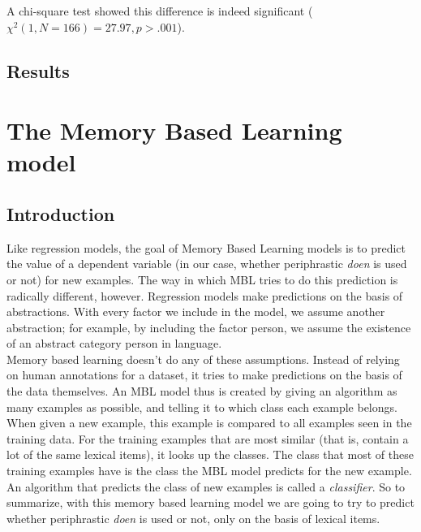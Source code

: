 \documentclass[12pt]{article}
\begin{document}
A chi-square test showed this difference is indeed significant ($\chi^2(1, N=166) = 27.97, p > .001$).


\subsection{Results} \label{regressionresults}








\section{The Memory Based Learning model} \label{mbl}

\subsection{Introduction}

Like regression models, the goal of Memory Based Learning models is to predict the value of a dependent variable (in our case, whether periphrastic \emph{doen} is used or not) for new examples. The way in which MBL tries to do this prediction is radically different, however. Regression models make predictions on the basis of abstractions. With every factor we include in the model, we assume another abstraction; for example, by including the factor person, we assume the existence of an abstract category person in language.\\\indent
Memory based learning doesn't do any of these assumptions. Instead of relying on human annotations for a dataset, it tries to make predictions on the basis of the data themselves. An MBL model thus is created by giving an algorithm as many examples as possible, and telling it to which class each example belongs. When given a new example, this example is compared to all examples seen in the training data. For the training examples that are most similar (that is, contain a lot of the same lexical items), it looks up the classes. The class that most of these training examples have is the class the MBL model predicts for the new example. An algorithm that predicts the class of new examples is called a \emph{classifier}. So to summarize, with this memory based learning model we are going to try to predict whether periphrastic \emph{doen} is used or not, only on the basis of lexical items.
\end{document}
